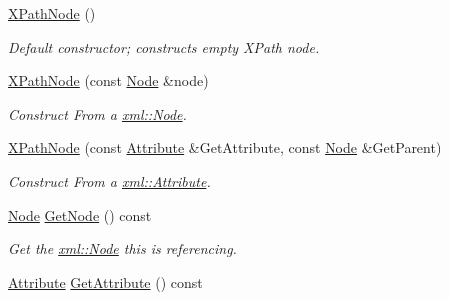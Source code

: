 \begin{DoxyCompactItemize}
\item 
\hypertarget{classphys_1_1xml_1_1XPathNode_a5e4ac19a93960347f4ce9dc05c88e26d}{
\hyperlink{classphys_1_1xml_1_1XPathNode_a5e4ac19a93960347f4ce9dc05c88e26d}{XPathNode} ()}
\label{df/dd4/classphys_1_1xml_1_1XPathNode_a5e4ac19a93960347f4ce9dc05c88e26d}

\begin{DoxyCompactList}\small\item\em Default constructor; constructs empty XPath node. \item\end{DoxyCompactList}\item 
\hyperlink{classphys_1_1xml_1_1XPathNode_ab70dcfefef2107eca2d1932faada475e}{XPathNode} (const \hyperlink{classphys_1_1xml_1_1Node}{Node} \&node)
\begin{DoxyCompactList}\small\item\em Construct From a \hyperlink{classphys_1_1xml_1_1Node}{xml::Node}. \item\end{DoxyCompactList}\item 
\hyperlink{classphys_1_1xml_1_1XPathNode_a3f9446596022b6e0ab77afc2748c98e0}{XPathNode} (const \hyperlink{classphys_1_1xml_1_1Attribute}{Attribute} \&GetAttribute, const \hyperlink{classphys_1_1xml_1_1Node}{Node} \&GetParent)
\begin{DoxyCompactList}\small\item\em Construct From a \hyperlink{classphys_1_1xml_1_1Attribute}{xml::Attribute}. \item\end{DoxyCompactList}\item 
\hyperlink{classphys_1_1xml_1_1Node}{Node} \hyperlink{classphys_1_1xml_1_1XPathNode_ad34ea7db6cabdfe92656b7d033dbbf35}{GetNode} () const 
\begin{DoxyCompactList}\small\item\em Get the \hyperlink{classphys_1_1xml_1_1Node}{xml::Node} this is referencing. \item\end{DoxyCompactList}\item 
\hypertarget{classphys_1_1xml_1_1XPathNode_a258785388868adf9fa53437cac7cd41c}{
\hyperlink{classphys_1_1xml_1_1Attribute}{Attribute} \hyperlink{classphys_1_1xml_1_1XPathNode_a258785388868adf9fa53437cac7cd41c}{GetAttribute} () const }
\label{df/dd4/classphys_1_1xml_1_1XPathNode_a258785388868adf9fa53437cac7cd41c}


\end{DoxyCompactItemize}
